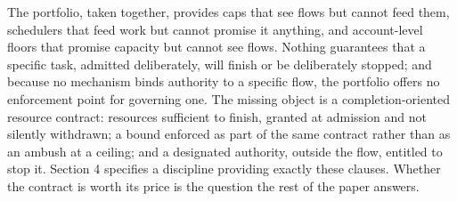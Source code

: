 The portfolio, taken together, provides caps that see flows but cannot
feed them, schedulers that feed work but cannot promise it anything, and
account-level floors that promise capacity but cannot see flows. Nothing
guarantees that a specific task, admitted deliberately, will finish or be
deliberately stopped; and because no mechanism binds authority to a
specific flow, the portfolio offers no enforcement point for governing
one. The missing object is a completion-oriented resource contract:
resources sufficient to finish, granted at admission and not silently
withdrawn; a bound enforced as part of the same contract rather than as
an ambush at a ceiling; and a designated authority, outside the flow,
entitled to stop it. Section 4 specifies a discipline providing exactly
these clauses. Whether the contract is worth its price is the question
the rest of the paper answers.
